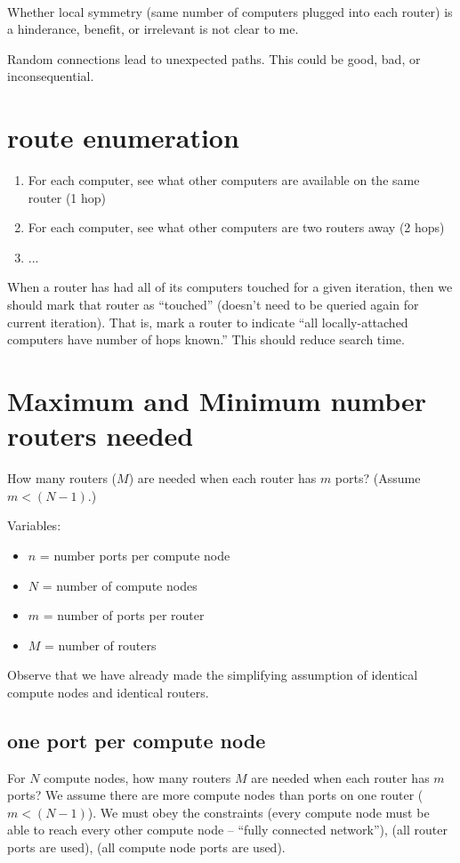 \documentclass[pdftex]{article}
\begin{document}
\ \\
Whether local symmetry (same number of computers plugged into each router) is a hinderance, benefit, or irrelevant is not clear to me.

Random connections lead to unexpected paths. This could be good, bad, or inconsequential.

\section{route enumeration}

\begin{enumerate}
 \item For each computer, see what other computers are available on the same router (1 hop)
 \item For each computer, see what other computers are two routers away (2 hops)
 \item ...
\end{enumerate}
When a router has had all of its computers touched for a given iteration, then we should mark that router as ``touched'' (doesn't need to be queried again for current iteration). That is, mark a router to indicate ``all locally-attached computers have number of hops known.'' This should reduce search time.

\section{Maximum and Minimum number routers needed}
How many routers ($M$) are needed when each router has $m$ ports? (Assume $m<(N-1)$.)

Variables: 
\begin{itemize}
 \item $n$ = number ports per compute node
 \item $N$ = number of compute nodes
\item $m$ = number of ports per router
 \item $M$ = number of routers
\end{itemize}
Observe that we have already made the simplifying assumption of identical compute nodes and identical routers.

\subsection{one port per compute node}
For $N$ compute nodes, how many routers $M$ are needed when each router has $m$ ports? We assume there are more compute nodes than ports on one router ($m<(N-1)$). We must obey the constraints (every compute node must be able to reach every other compute node -- ``fully connected network''), (all router ports are used), (all compute node ports are used).
\end{document}
